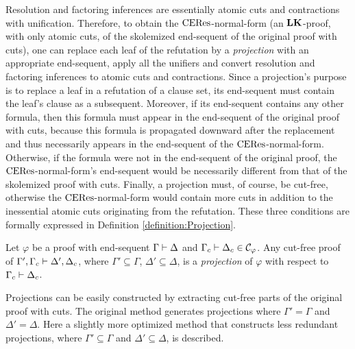 \noindent
Resolution and factoring inferences are essentially atomic cuts and contractions with unification. Therefore, to obtain the $\mathrm{CERes}$-normal-form (an $\mathbf{LK}$-proof, with only atomic cuts, of the skolemized end-sequent of the original proof with cuts), one can replace each leaf of the refutation by a \emph{projection} with an appropriate end-sequent, apply all the unifiers and convert resolution and factoring inferences to atomic cuts and contractions.
Since a projection's purpose is to replace a leaf in a refutation of a clause set, its end-sequent must contain the leaf's clause as a subsequent. Moreover, if its end-sequent contains any other formula, then this formula must appear in the end-sequent of the original proof with cuts, because this formula is propagated downward after the replacement and thus necessarily appears in the end-sequent of the $\mathrm{CERes}$-normal-form. Otherwise, if the formula were not in the end-sequent of the original proof, the $\mathrm{CERes}$-normal-form's end-sequent would be necessarily different from that of the skolemized proof with cuts. Finally, a projection must, of course, be cut-free, otherwise the $\mathrm{CERes}$-normal-form would contain more cuts in addition to the inessential atomic cuts originating from the refutation. These three conditions are formally expressed in Definition \ref{definition:Projection}.

\begin{definition}[Projection]
\label{definition:Projection}
Let $\varphi$ be a proof with end-sequent $\Gamma \vdash \Delta$ and $\Gamma_c \vdash \Delta_c \in \mathcal{C}_{\varphi}$. Any cut-free proof of $\Gamma', \Gamma_c \vdash \Delta', \Delta_c$, where $\Gamma' \subseteq \Gamma$, $\Delta' \subseteq \Delta$, is a \emph{projection} of $\varphi$ with respect to $\Gamma_c \vdash \Delta_c$.
\end{definition}

\noindent
Projections can be easily constructed by extracting cut-free parts of the original proof with cuts. 
The original method \cite{BaazLeitsch2009MethodsofCut-Elimination,BaazHetzlLeitschRichterSpohr2006ProofTransformationbyCERES,BaazLeitsch2000Cut-eliminationandRedundancy-eliminationbyResolution,BaazLeitsch1999MethodsofCut-Elimination,Richter2006ProofTransformationsbyResolution--ComputationalMethodsofCut-Elimination} generates projections where $\Gamma' = \Gamma$ and $\Delta' = \Delta$. Here a slightly more optimized method that constructs less redundant projections, where $\Gamma' \subseteq \Gamma$ and $\Delta' \subseteq \Delta$, is described. 


